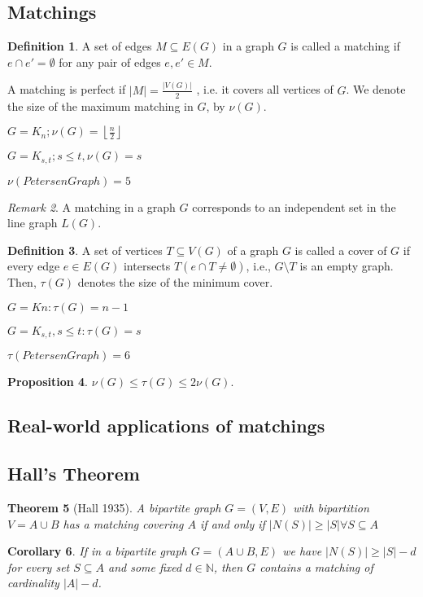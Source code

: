 \documentclass[10pt, fleqn, a4paper, landscape]{article}
\theoremstyle{plain} %
\newtheorem{thm}{Theorem}
\newtheorem{pro}[thm]{Proposition}
\newtheorem{cor}[thm]{Corollary}
\theoremstyle{remark} %
\newtheorem{rem}[thm]{Remark}
\theoremstyle{definition} %
\newtheorem{defi}[thm]{Definition}
\begin{document}
\begin{multicols}{3}
\begin{tiny}
\section{Matchings}
\begin{defi}
A set of edges $M \subseteq E(G)$ in a graph $G$ is called a matching if $e \cap e' = \emptyset$ for any pair of edges $e, e' \in M$.

A matching is perfect if $|M|=\frac{|V (G)|}{2}$ , i.e. it covers all vertices of $G$. We denote the size of the maximum matching in $G$, by $\nu(G)$.

$G=K_n; \nu(G)=\left\lfloor\frac{n}{2}\right\rfloor$

$G=K_{s,t}; s\le t, \nu(G)=s$

$\nu(Petersen Graph)=5$
\end{defi}
\addtocounter{thm}{1}
\begin{rem}
A matching in a graph $G$ corresponds to an independent set in the line graph $L(G)$.
\end{rem}
\begin{defi}
A set of vertices $T \subseteq V (G)$ of a graph  $G$ is called a cover of $G$ if every edge $e \in E(G)$ intersects $T (e \cap T \neq \emptyset)$, i.e., $G \setminus T$ is an empty graph. Then, $\tau(G)$ denotes the size of
the minimum cover.

$G = Kn: \tau(G) = n - 1$

$G = K_{s,t}, s \le t: \tau(G) = s$

$\tau(Petersen Graph)=6$
\end{defi}
\addtocounter{thm}{1}
\begin{pro}
$\nu(G) \le\tau(G) \le 2\nu(G).$
\end{pro}
\subsection{Real-world applications of matchings}

\subsection{Hall’s Theorem}
\begin{thm}[Hall 1935]
A bipartite graph $G = (V,E)$ with bipartition $V = A\cup B$ has a matching
covering $A$ if and only if $|N(S)|\ge|S|\forall S \subseteq A$
\end{thm}

\begin{cor}
 If in a bipartite graph $G = (A\cup B,E)$ we have $|N(S)|\ge|S|-d$ for every set $S \subseteq A$ and some fixed $d\in\mathbb{N}$, then $G$ contains a matching of cardinality $|A|- d$.
\end{cor}


\end{tiny}
\end{multicols}
\end{document}
